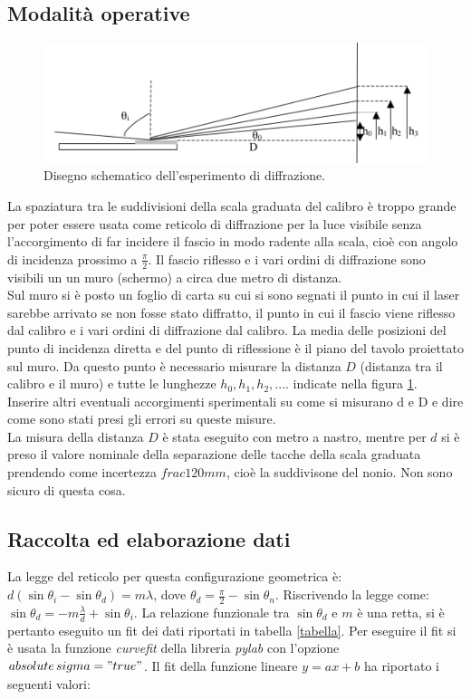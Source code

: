 \documentclass[10pt,a4paper]{article}
\begin{document}
\subsection{Modalità operative}
\begin{figure}[!htb]
  \centering
  \includegraphics[scale=.5]{disegno1.png}
\caption{Disegno schematico dell'esperimento di diffrazione.}
\label{parteAfigura}

\end{figure}
La spaziatura tra le suddivisioni della scala graduata del calibro è troppo grande per poter essere usata come reticolo di diffrazione per la luce visibile senza l'accorgimento di far incidere il fascio in modo radente alla scala, cioè con angolo di incidenza prossimo a $\frac{\pi}{2}$. Il fascio riflesso e i vari ordini di diffrazione sono visibili un un muro (schermo) a circa due metro di distanza.\\
Sul muro si è posto un foglio di carta su cui si sono segnati il punto in cui il laser sarebbe arrivato se non fosse stato diffratto, il punto in cui il fascio viene riflesso dal calibro e i vari ordini di diffrazione dal calibro. La media delle posizioni del punto di incidenza diretta e del punto di riflessione è il piano del tavolo proiettato sul muro. Da questo punto è necessario misurare la distanza $D$ (distanza tra il calibro e il muro) e tutte le lunghezze $h_0, h_1, h_2,...$. indicate nella figura \ref{parteAfigura}.\\
Inserire altri eventuali accorgimenti sperimentali su come si misurano d e D e dire come sono stati presi gli errori su queste misure.\\
La misura della distanza $D$ è stata eseguito con metro a nastro, mentre per $d$ si è preso il valore nominale della separazione delle tacche della scala graduata prendendo come incertezza $frac{1}{20} mm$, cioè la suddivisone del nonio. Non sono sicuro di questa cosa.\\
\subsection{Raccolta ed elaborazione dati}
La legge del reticolo per questa configurazione geometrica è: $d(\sin  \theta_i - \sin \theta_d)  = m \lambda $, dove $\theta_d = \frac{\pi}{2} - \sin \theta_n $. Riscrivendo la legge come: $\sin \theta_d = -m \frac{\lambda}{d} + \sin \theta_i$. La relazione funzionale tra $\sin  \theta_d$ e $m$ è una retta, si è pertanto eseguito un fit dei dati riportati in tabella \ref{tabella}. Per eseguire il fit si è usata la funzione \emph{curvefit} della libreria \emph{pylab} con l'opzione \emph{$absolute\,sigma = "true"$}. Il fit della funzione lineare $y = ax+b$ ha riportato i seguenti valori: \\
\end{document}
